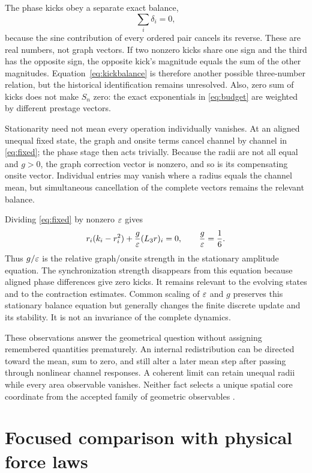 \documentclass[11pt,a4paper]{article}
\numberwithin{equation}{section}
\theoremstyle{remark}\newtheorem{remark}[theorem]{Remark}
\begin{document}
The phase kicks obey a separate exact balance,
\begin{equation}
\sum_i\delta_i=0,\label{eq:kickbalance}
\end{equation}
because the sine contribution of every ordered pair cancels its reverse. These are real numbers, not graph vectors. If two nonzero kicks share one sign and the third has the opposite sign, the opposite kick's magnitude equals the sum of the other magnitudes. Equation~\eqref{eq:kickbalance} is therefore another possible three-number relation, but the historical identification remains unresolved. Also, zero sum of kicks does not make $S_n$ zero: the exact exponentials in \eqref{eq:budget} are weighted by different prestage vectors.

Stationarity need not mean every operation individually vanishes. At an aligned unequal fixed state, the graph and onsite terms cancel channel by channel in \eqref{eq:fixed}; the phase stage then acts trivially. Because the radii are not all equal and $g>0$, the graph correction vector is nonzero, and so is its compensating onsite vector. Individual entries may vanish where a radius equals the channel mean, but simultaneous cancellation of the complete vectors remains the relevant balance.

Dividing \eqref{eq:fixed} by nonzero $\varepsilon$ gives
\begin{equation}
r_i(k_i-r_i^2)+\frac g{\varepsilon}(L_3r)_i=0,
\qquad\frac g{\varepsilon}=\frac16.\label{eq:ratioforce}
\end{equation}
Thus $g/\varepsilon$ is the relative graph/onsite strength in the stationary amplitude equation. The synchronization strength disappears from this equation because aligned phase differences give zero kicks. It remains relevant to the evolving states and to the contraction estimates. Common scaling of $\varepsilon$ and $g$ preserves this stationary balance equation but generally changes the finite discrete update and its stability. It is not an invariance of the complete dynamics.

These observations answer the geometrical question without assigning remembered quantities prematurely. An internal redistribution can be directed toward the mean, sum to zero, and still alter a later mean step after passing through nonlinear channel responses. A coherent limit can retain unequal radii while every area observable vanishes. Neither fact selects a unique spatial core coordinate from the accepted family of geometric observables \cite{closure}.

\section{Focused comparison with physical force laws}\label{sec:physics}
\end{document}
